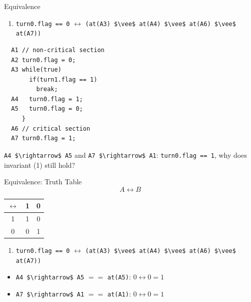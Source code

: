 \begin{frame}[fragile]{Equivalence}
  \begin{enumerate}
  \item \lstinline!turn0.flag == 0! $\leftrightarrow$ 
    \lstinline!(at(A3) $\vee$ at(A4) $\vee$ at(A6) $\vee$ at(A7))!
  \end{enumerate}


\begin{lstlisting}
  A1 // non-critical section
  A2 turn0.flag = 0;
  A3 while(true)
       if(turn1.flag == 1) 
         break;
  A4   turn0.flag = 1;
  A5   turn0.flag = 0;
     }
  A6 // critical section
  A7 turn0.flag = 1;
\end{lstlisting}


  \lstinline!A4 $\rightarrow$ A5! and \lstinline!A7 $\rightarrow$ A1!:
  \lstinline!turn0.flag == 1!, why does invariant (1) still hold?
\end{frame}

\begin{frame}{Equivalence: Truth Table}
  $$A \leftrightarrow B$$


  \begin{center}
    \begin{tabular}{|c|c c|}
      \hline
      $\leftrightarrow$ & 1 & 0 \\\hline
      1 & 1 & 0 \\
      0 & 0 & 1 \\\hline
    \end{tabular}
  \end{center}


  \begin{enumerate}
  \item \lstinline!turn0.flag == 0! $\leftrightarrow$ 
    \lstinline!(at(A3) $\vee$ at(A4) $\vee$ at(A6) $\vee$ at(A7))!
  \end{enumerate}


  \begin{itemize}  
  \item \lstinline!A4 $\rightarrow$ A5! $==$ \lstinline!at(A5)!: $0
    \leftrightarrow 0 = 1$
  \item \lstinline!A7 $\rightarrow$ A1! $==$ \lstinline!at(A1)!: $0
    \leftrightarrow 0 = 1$
  \end{itemize}
\end{frame}


